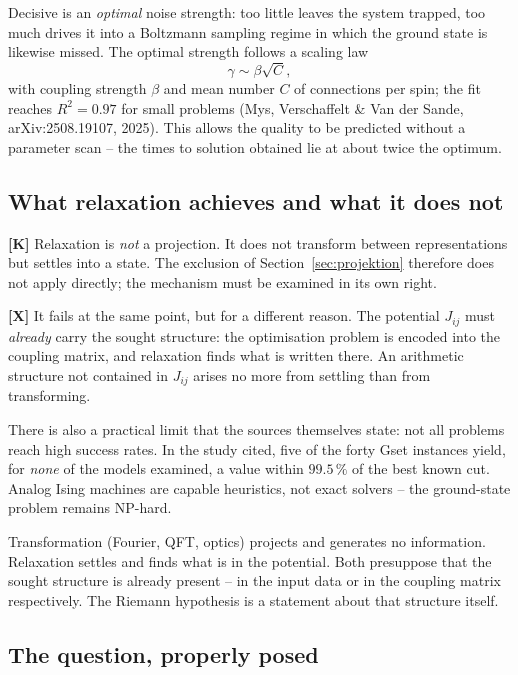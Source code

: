 Decisive is an \emph{optimal} noise strength: too little leaves the system
trapped, too much drives it into a Boltzmann sampling regime in which the
ground state is likewise missed. The optimal strength follows a scaling law
\begin{equation}
  \gamma \sim \beta \sqrt{C},
\end{equation}
with coupling strength $\beta$ and mean number $C$ of connections per spin;
the fit reaches $R^2 = 0.97$ for small problems (Mys, Verschaffelt \& Van
der Sande, arXiv:2508.19107, 2025). This allows the quality to be predicted
without a parameter scan -- the times to solution obtained lie at about
twice the optimum.

\subsection{What relaxation achieves and what it does not}

\textbf{[K]} Relaxation is \emph{not} a projection. It does not transform
between representations but settles into a state. The exclusion of
Section~\ref{sec:projektion} therefore does not apply directly; the
mechanism must be examined in its own right.

\textbf{[X]} It fails at the same point, but for a different reason. The
potential $J_{ij}$ must \emph{already} carry the sought structure: the
optimisation problem is encoded into the coupling matrix, and relaxation
finds what is written there. An arithmetic structure not contained in
$J_{ij}$ arises no more from settling than from transforming.

There is also a practical limit that the sources themselves state: not all
problems reach high success rates. In the study cited, five of the forty
Gset instances yield, for \emph{none} of the models examined, a value
within $99.5\,\%$ of the best known cut. Analog Ising machines are capable
heuristics, not exact solvers -- the ground-state problem remains NP-hard.

\begin{keyresult}
Transformation (Fourier, QFT, optics) projects and generates no
information. Relaxation settles and finds what is in the potential. Both
presuppose that the sought structure is already present -- in the input
data or in the coupling matrix respectively. The Riemann hypothesis is a
statement about that structure itself.
\end{keyresult}

\subsection{The question, properly posed}

